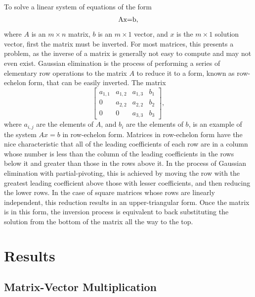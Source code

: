 \documentclass{dependencies/acm_proc_article-sp}
\begin{document}
To solve a linear system of equations of the form 
\begin{equation}
$Ax=b$, 
\end{equation}
where $A$ is an $m\times n$ matrix, $b$ is an $m\times 1$ vector, and $x$ is the $m\times 1$ solution vector, first the matrix must be inverted. For most matrices, this presents a problem, as the inverse of a matrix is generally not easy to compute and may not even exist. Gaussian elimination is the process of performing a series of elementary row operations to the matrix $A$ to reduce it to a form, known as row-echelon form, that can be easily inverted. The matrix 
\begin{equation} 
\left[ \begin{array}{ccc|c}
a_{1,1} & a_{1,2} & a_{1,3} & b_1 \\
0 & a_{2,2} & a_{2,2} & b_2 \\
0 & 0 & a_{3,3} & b_3
\end{array} \right],
\end{equation}
where $a_{i,j}$ are the elements of $A$, and $b_i$ are the elements of $b$, is an example of the system $Ax=b$ in row-echelon form. Matrices in row-echelon form have the nice characteristic that all of the leading coefficients of each row are in a column whose number is less than the column of the leading coefficients in the rows below it and greater than those in the rows above it. In the process of Gaussian elimination with partial-pivoting, this is achieved by moving the row with the greatest leading coefficient above those with lesser coefficients, and then reducing the lower rows. In the case of square matrices whose rows are linearly independent, this reduction results in an upper-triangular form. Once the matrix is in this form, the inversion process is equivalent to back substituting the solution from the bottom of the matrix all the way to the top.

\section{Results}

\subsection{Matrix-Vector Multiplication}
\end{document}
